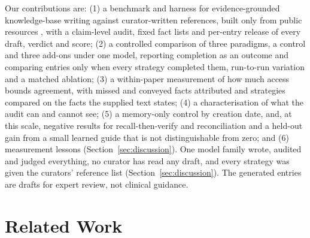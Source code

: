 \documentclass{article} %
\begin{document}
Our contributions are: (1) a benchmark and harness for evidence-grounded knowledge-base writing against curator-written references, built only from public resources \citep{sayers2026database,Louden2020MedgenNcbis,rosonovski2024europe,seal2023genenames}, with a claim-level audit, fixed fact lists and per-entry release of every draft, verdict and score; (2) a controlled comparison of three paradigms, a control and three add-ons under one model, reporting completion as an outcome and comparing entries only when every strategy completed them, run-to-run variation and a matched ablation; (3) a within-paper measurement of how much access bounds agreement, with missed and conveyed facts attributed and strategies compared on the facts the supplied text states; (4) a characterisation of what the audit can and cannot see; (5) a memory-only control by creation date, and, at this scale, negative results for recall-then-verify and reconciliation and a held-out gain from a small learned guide that is not distinguishable from zero; and (6) measurement lessons (Section~\ref{sec:discussion}). One model family wrote, audited and judged everything, no curator has read any draft, and every strategy was given the curators' reference list (Section~\ref{sec:discussion}). The generated entries are drafts for expert review, not clinical guidance.

\section{Related Work}
\label{sec:related_work}
\end{document}
